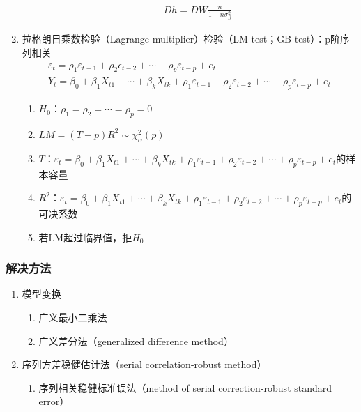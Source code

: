 \documentclass[12pt]{book}
\begin{document}
\begin{enumerate}[1.]
\begin{enumerate}[(1)]
        \begin{gather*}
            Dh=DW\frac{n}{1-n\sigma_\beta^2}
        \end{gather*} 
    \end{enumerate}
    \item 拉格朗日乘数检验（Lagrange multiplier）检验（LM test；GB test）：p阶序列相关
    \begin{gather*}
        \varepsilon_t=\rho_1\varepsilon_{t-1}+\rho_2\epsilon_{t-2}+\cdots+\rho_p\varepsilon_{t-p}+e_t\\ 
        Y_t=\beta_0+\beta_1X_{t1}+\cdots+\beta_kX_{tk}+\rho_1\varepsilon_{t-1}+\rho_2\varepsilon_{t-2}+\cdots+\rho_p\varepsilon_{t-p}+e_t
    \end{gather*}
    \begin{enumerate}[(1)]
        \item $H_0$：$\rho_1=\rho_2=\cdots=\rho_p=0$
        \item $LM={(T-p)R}^2\sim\chi_\alpha^2(p)$
        \item $T$：$\varepsilon_t=\beta_0+\beta_{1}X_{t1}+\cdots+\beta_{k}X_{tk}+\rho_{1}\varepsilon_{t-1}+\rho_{2}\varepsilon_{t-2}+\cdots+\rho_{p}\varepsilon_{t-p}+e_{t}$的样本容量
        \item $R^2$：$\varepsilon_t=\beta_0+\beta_1X_{t1}+\cdots+\beta_kX_{tk}+\rho_1\varepsilon_{t-1}+\rho_{2}\varepsilon_{t-2}+\cdots+\rho_{p}\varepsilon_{t-p}+e_{t}$的可决系数
        \item 若LM超过临界值，拒$H_0$
    \end{enumerate}
\end{enumerate}


\subsubsection{解决方法}

\begin{enumerate}[1.]
    \item 模型变换
          \begin{enumerate}[(1)]
              \item 广义最小二乘法
              \item 广义差分法（generalized difference method）
          \end{enumerate}
    \item 序列方差稳健估计法（serial correlation-robust method）
          \begin{enumerate}[(1)]
              \item 序列相关稳健标准误法（method of serial correction-robust standard error）
          \end{enumerate}
\end{enumerate}
\end{document}
